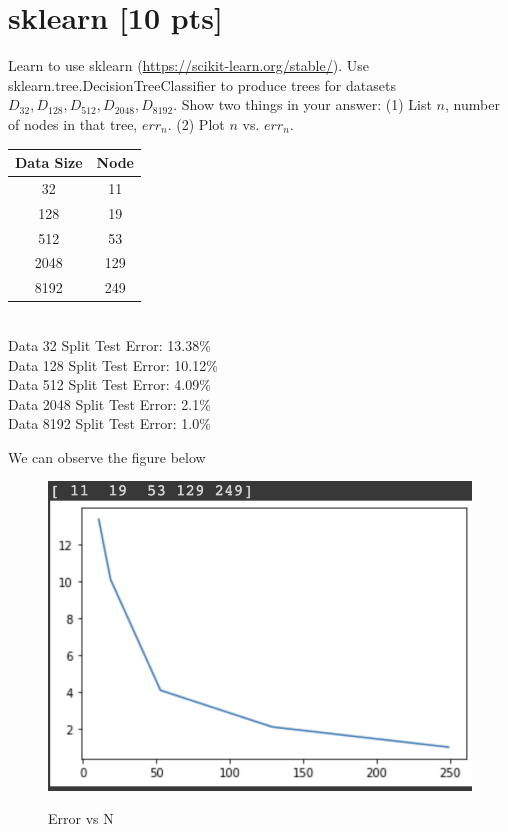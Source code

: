 \documentclass[a4paper]{article}
\theoremstyle{definition}
\newenvironment{soln}{
    \leavevmode\color{blue}\ignorespaces
}{}
\begin{document}
\section{sklearn [10 pts]}
Learn to use sklearn (\url{https://scikit-learn.org/stable/}).
Use sklearn.tree.DecisionTreeClassifier to produce trees for datasets $D_{32}, D_{128}, D_{512}, D_{2048}, D_{8192}$.  Show two things in your answer: (1) List $n$, number of nodes in that tree, $err_n$. (2) Plot $n$ vs. $err_n$.\\
\begin{soln}
\begin{center}
    

  \begin{tabular}{|c|c|}
            \hline
            Data Size & Node \\
            \hline
            32 & 11\\
            128 & 19\\
            512 & 53\\
            2048 & 129 \\
            8192 & 249 \\
            \hline
        \end{tabular}\\
  
      Data 32 Split Test Error: 13.38\%\\
      Data 128 Split Test Error: 10.12\%\\
      Data 512 Split Test Error: 4.09\%\\
      Data 2048 Split Test Error: 2.1\%\\
      Data 8192 Split Test Error: 1.0\%\\
      \end{center}
      We can observe the figure below
        \begin{figure}[H]
            \centering
            \includegraphics[scale=0.5]{sktest.png}
            \label{fig:q2}
            \caption{Error vs N}
        \end{figure} 
    

\end{soln}
\end{document}
